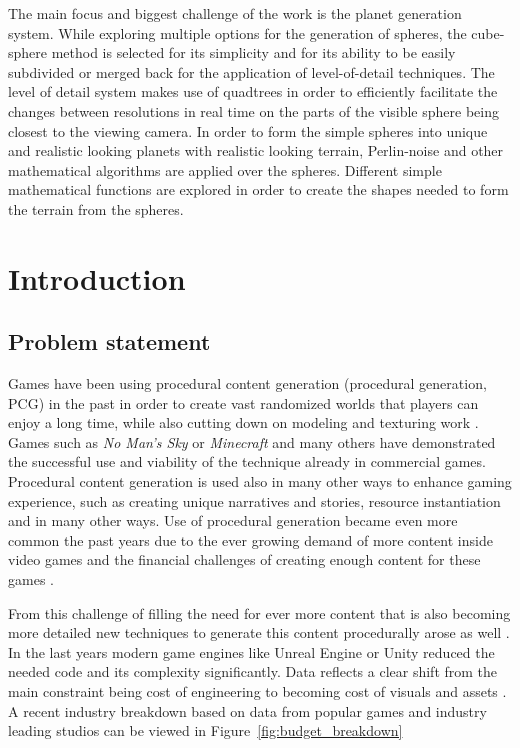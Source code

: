 \documentclass[12pt]{report}
\begin{document}
The main focus and biggest challenge of the work is the planet generation system. While exploring multiple options for the generation of spheres, the cube-sphere method is selected for its simplicity and for its ability to be easily subdivided or merged back for the application of level-of-detail techniques. The level of detail system makes use of quadtrees in order to efficiently facilitate the changes between resolutions in real time on the parts of the visible sphere being closest to the viewing camera. In order to form the simple spheres into unique and realistic looking planets with realistic looking terrain, Perlin-noise and other mathematical algorithms are applied over the spheres. Different simple mathematical functions are explored in order to create the shapes needed to form the terrain from the spheres.

\newpage
\tableofcontents
\newpage

\chapter{Introduction}
\section{Problem statement}

Games have been using procedural content generation (procedural generation, PCG) in the past \cite{pcgsmith2012, smelik2014} in order to create vast randomized worlds that players can enjoy a long time, while also cutting down on modeling and texturing work \cite{hendrikx2013}. Games such as \textit{No Man's Sky} or \textit{Minecraft} and many others have demonstrated the successful use and viability of the technique already in commercial games. Procedural content generation is used also in many other ways to enhance gaming experience, such as creating unique narratives and stories, resource instantiation and in many other ways. Use of procedural generation became even more common the past years due to the ever growing demand of more content inside video games and the financial challenges of creating enough content for these games \cite{hendrikx2013, 1118424ar}. 

From this challenge of filling the need for ever more content that is also becoming more detailed new techniques to generate this content procedurally arose as well \cite{korn2017game}. In the last years modern game engines like Unreal Engine or Unity reduced the needed code and its complexity significantly. Data reflects a clear shift from the main constraint being cost of engineering to becoming cost of visuals and assets \cite{serpa2019towards, martins2026financial}. A recent industry breakdown based on data from popular games and industry leading studios can be viewed in  Figure~\ref{fig:budget_breakdown}
\end{document}
